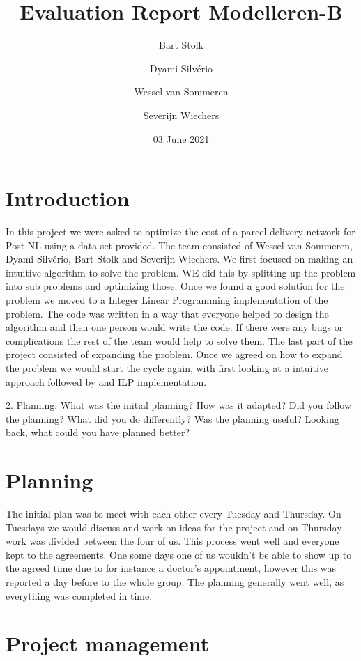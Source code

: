 \documentclass{article}
\title{Evaluation Report Modelleren-B}
\author{Bart Stolk \and Dyami Silvério \and Wessel van Sommeren \and Severijn Wiechers}
\date{03 June 2021}
\begin{document}
\maketitle
\newpage
\tableofcontents
\newpage

\section{Introduction}

In this project we were asked to optimize the cost of a parcel delivery network for Post NL using a data set provided. The team consisted of Wessel van Sommeren, Dyami Silvério, Bart Stolk and Severijn Wiechers. We first focused on making an intuitive algorithm to solve the problem. WE did this by splitting up the problem into sub problems and optimizing those. Once we found a good solution for the problem we moved to a Integer Linear Programming implementation of the problem. The code was written in a way that everyone helped to design the algorithm and then one person would write the code. If there were any bugs or complications the rest of the team would help to solve them. The last part of the project consisted of expanding the problem. Once we agreed on how to expand the problem we would start the cycle again, with first looking at a intuitive approach followed by and ILP implementation. 





2. Planning: What was the initial planning? How was it adapted? Did you follow
the planning? What did you do differently? Was the planning useful? Looking
back, what could you have planned better?
\section{Planning}

The initial plan was to meet with each other every Tuesday and Thursday. On Tuesdays we would discuss and work on ideas for the project and on Thursday work was divided between the four of us. This process went well and everyone kept to the agreements. One some days one of us wouldn't be able to show up to the agreed time due to for instance a doctor's appointment, however this was reported a day before to the whole group. The planning generally went well, as everything was completed in time.

\section{Project management}
\end{document}
